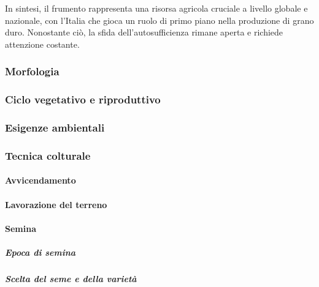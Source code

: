\documentclass[
]{book}
\theoremstyle{definition}
\theoremstyle{definition}
\theoremstyle{definition}
\theoremstyle{definition}
\theoremstyle{remark}
\begin{document}
In sintesi, il frumento rappresenta una risorsa agricola cruciale a livello globale e nazionale, con l'Italia che gioca un ruolo di primo piano nella produzione di grano duro. Nonostante ciò, la sfida dell'autosufficienza rimane aperta e richiede attenzione costante.

\hypertarget{morfologia}{%
\subsubsection{Morfologia}\label{morfologia}}

\hypertarget{ciclo-vegetativo-e-riproduttivo}{%
\subsubsection{Ciclo vegetativo e riproduttivo}\label{ciclo-vegetativo-e-riproduttivo}}

\hypertarget{esigenze-ambientali}{%
\subsubsection{Esigenze ambientali}\label{esigenze-ambientali}}

\hypertarget{tecnica-colturale}{%
\subsubsection{Tecnica colturale}\label{tecnica-colturale}}

\hypertarget{avvicendamento}{%
\paragraph{Avvicendamento}\label{avvicendamento}}

\hypertarget{lavorazione-del-terreno}{%
\paragraph{Lavorazione del terreno}\label{lavorazione-del-terreno}}

\hypertarget{semina}{%
\paragraph{Semina}\label{semina}}

\hypertarget{epoca-di-semina}{%
\subparagraph{Epoca di semina}\label{epoca-di-semina}}

\hypertarget{scelta-del-seme-e-della-varietuxe0}{%
\subparagraph{Scelta del seme e della varietà}\label{scelta-del-seme-e-della-varietuxe0}}
\end{document}
